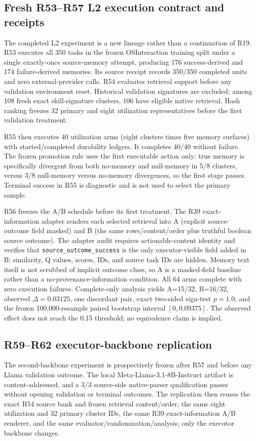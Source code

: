 \subsection{Fresh R53--R57 L2 execution contract and receipts}
The completed L2 experiment is a new lineage rather than a continuation of R19. R53 executes all 350 tasks in the frozen OSInteraction training split under a single exactly-once source-memory attempt, producing 176 success-derived and 174 failure-derived memories. Its source receipt records 350/350 completed units and zero external-provider calls. R54 evaluates retrieval support before any validation environment reset. Historical validation signatures are excluded; among 108 fresh exact skill-signature clusters, 106 have eligible native retrieval. Hash ranking freezes 32 primary and eight utilization representatives before the first validation treatment.

R55 then executes 40 utilization arms (eight clusters times five memory surfaces) with started/completed durability ledgers. It completes 40/40 without failure. The frozen promotion rule uses the first executable action only: true memory is specifically divergent from both no-memory and null-memory in 5/8 clusters, versus 3/8 null-memory versus no-memory divergences, so the first stage passes. Terminal success in R55 is diagnostic and is not used to select the primary sample.

R56 freezes the A/B schedule before its first treatment. The R39 exact-information adapter renders each selected retrieval into A (explicit source-outcome field masked) and B (the same rows/content/order plus truthful boolean source outcome). The adapter audit requires actionable-content identity and verifies that \texttt{source\_outcome\_success} is the only executor-visible field added in B; similarity, Q values, scores, IDs, and source task IDs are hidden. Memory text itself is not scrubbed of implicit outcome clues, so A is a masked-field baseline rather than a no-provenance-information condition. All 64 arms complete with zero execution failures. Complete-only analysis yields A=15/32, B=16/32, observed $\Delta=0.03125$, one discordant pair, exact two-sided sign-test $p=1.0$, and the frozen 100,000-resample paired bootstrap interval $[0,0.09375]$. The observed effect does not reach the 0.15 threshold; no equivalence claim is implied.

\subsection{R59--R62 executor-backbone replication}
The second-backbone experiment is prospectively frozen after R57 and before any Llama validation outcome. The local Meta-Llama-3.1-8B-Instruct artifact is content-addressed, and a 3/3 source-side native-parser qualification passes without opening validation or terminal outcomes. The replication then reuses the exact R54 source bank and frozen retrieval content/order, the same eight utilization and 32 primary cluster IDs, the same R39 exact-information A/B renderer, and the same evaluator/randomization/analysis; only the executor backbone changes.

